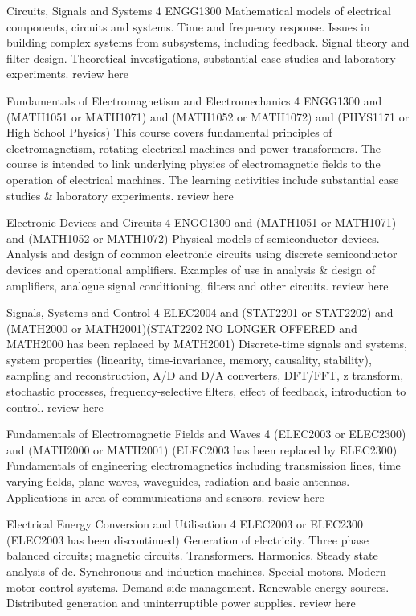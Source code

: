 	{Circuits, Signals and Systems}
	{4}
	{ENGG1300}
	{}
	{}
	{Mathematical models of electrical components, circuits and systems. Time and frequency response. Issues in building complex systems from subsystems, including feedback. Signal theory and filter design. Theoretical investigations, substantial case studies and laboratory experiments.}
	{review here}

	{Fundamentals of Electromagnetism and Electromechanics}
	{4}
	{ENGG1300 and (MATH1051 or MATH1071) and (MATH1052 or MATH1072) and (PHYS1171 or High School Physics)}
	{}
	{}
	{This course covers fundamental principles of electromagnetism, rotating electrical machines and power transformers. The course is intended to link underlying physics of electromagnetic fields to the operation of electrical machines. The learning activities include substantial case studies & laboratory experiments.}
	{review here}

	{Electronic Devices and Circuits}
	{4}
	{ENGG1300 and (MATH1051 or MATH1071) and (MATH1052 or MATH1072)}
	{}
	{}
	{Physical models of semiconductor devices. Analysis and design of common electronic circuits using discrete semiconductor devices and operational amplifiers. Examples of use in analysis & design of amplifiers, analogue signal conditioning, filters and other circuits.}
	{review here}

	{Signals, Systems and Control}
	{4}
	{ELEC2004 and (STAT2201 or STAT2202) and (MATH2000 or MATH2001)(STAT2202 NO LONGER OFFERED and MATH2000 has been replaced by MATH2001)}
	{}
	{}
	{Discrete-time signals and systems, system properties (linearity, time-invariance, memory, causality, stability), sampling and reconstruction, A/D and D/A converters, DFT/FFT, z transform, stochastic processes, frequency-selective filters, effect of feedback, introduction to control.}
	{review here}

	{Fundamentals of Electromagnetic Fields and Waves}
	{4}
	{(ELEC2003 or ELEC2300) and (MATH2000 or MATH2001) (ELEC2003 has been replaced by ELEC2300)}
	{}
	{}
	{Fundamentals of engineering electromagnetics including transmission lines, time varying fields, plane waves, waveguides, radiation and basic antennas. Applications in area of communications and sensors.}
	{review here}

	{Electrical Energy Conversion and Utilisation}
	{4}
	{ELEC2003 or ELEC2300 (ELEC2003 has been discontinued)}
	{}
	{}
	{Generation of electricity. Three phase balanced circuits; magnetic circuits. Transformers. Harmonics. Steady state analysis of dc. Synchronous and induction machines. Special motors. Modern motor control systems. Demand side management. Renewable energy sources. Distributed generation and uninterruptible power supplies.}
	{review here}

